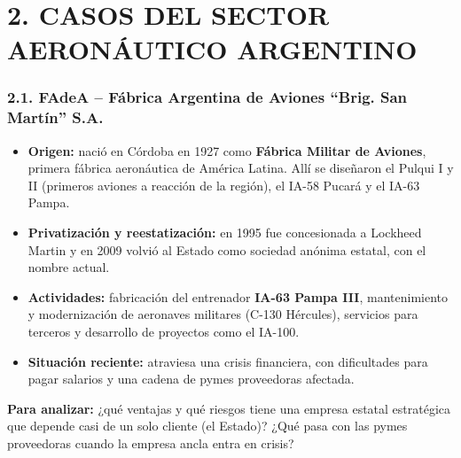 \section*{2. CASOS DEL SECTOR AERONÁUTICO ARGENTINO}

\subsubsection*{2.1. FAdeA -- Fábrica Argentina de Aviones ``Brig. San Martín'' S.A.}
\begin{itemize}
  \item \textbf{Origen:} nació en Córdoba en 1927 como \textbf{Fábrica Militar de Aviones},
        primera fábrica aeronáutica de América Latina. Allí se diseñaron el Pulqui I y II
        (primeros aviones a reacción de la región), el IA-58 Pucará y el IA-63 Pampa.
  \item \textbf{Privatización y reestatización:} en 1995 fue concesionada a Lockheed Martin y
        en 2009 volvió al Estado como sociedad anónima estatal, con el nombre actual.
  \item \textbf{Actividades:} fabricación del entrenador \textbf{IA-63 Pampa III},
        mantenimiento y modernización de aeronaves militares (C-130 Hércules), servicios para
        terceros y desarrollo de proyectos como el IA-100.
  \item \textbf{Situación reciente:} atraviesa una crisis financiera, con dificultades para
        pagar salarios y una cadena de pymes proveedoras afectada.
\end{itemize}
\textbf{Para analizar:} ¿qué ventajas y qué riesgos tiene una empresa estatal estratégica que
depende casi de un solo cliente (el Estado)? ¿Qué pasa con las pymes proveedoras cuando la
empresa ancla entra en crisis?

